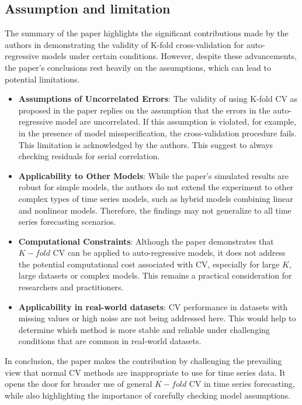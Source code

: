 \documentclass[12pt, oneside]{amsart}
\theoremstyle{definition}
\theoremstyle{remark}
\numberwithin{equation}{section}
\begin{document}
\subsection{Assumption and limitation} 
The summary of the paper highlights the significant contributions made by the authors in demonstrating the validity of K-fold cross-validation for auto-regressive models under certain conditions. However, despite these advancements, the paper's conclusions rest heavily on the assumptions, which can lead to potential limitations.
\begin{itemize}
    \item \textbf{Assumptions of Uncorrelated Errors}: The validity of using K-fold CV as proposed in the paper replies on the assumption that the errors in the auto-regressive model are uncorrelated. If this assumption is violated, for example, in the presence of model misspecification, the cross-validation procedure fails. This limitation is acknowledged by the authors. This suggest to always checking residuals for serial correlation. 
    \item \textbf{Applicability to Other Models}: While the paper's simulated results are robust for simple models, the authors do not extend the experiment to other complex types of time series models, such as hybrid models combining linear and nonlinear models. Therefore, the findings may not generalize to all time series forecasting scenarios.
    \item \textbf{Computational Constraints}: Although the paper demonstrates that $K-fold$ CV can be applied to auto-regressive models, it does not address the potential computational cost associated with CV, especially for large $K$, large datasets or complex models. This remains a practical consideration for researchers and practitioners.
    \item \textbf{Applicability in real-world datasets}: CV performance in datasets with missing values or high noise are not being addressed here. This would help to determine which method is more stable and reliable under challenging conditions that are common in real-world datasets.
\end{itemize}

In conclusion, the paper makes the contribution by challenging the prevailing view that normal CV methods are inappropriate to use for time series data. It opens the door for broader use of general $K-fold$ CV in time series forecasting, while also highlighting the importance of carefully checking model assumptions.
\end{document}
